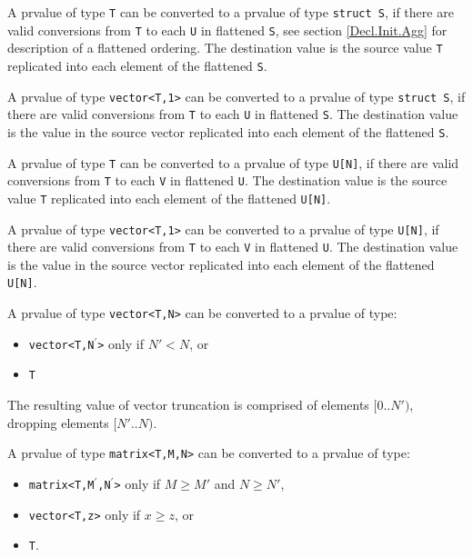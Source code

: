 
\p A prvalue of type \texttt{T} can be converted to a prvalue of type
\texttt{struct S}, if there are valid conversions from \texttt{T} to each
\texttt{U} in flattened \texttt{S}, see section \ref{Decl.Init.Agg} for
description of a flattened ordering. The destination value is the source value
\texttt{T} replicated into each element of the flattened \texttt{S}.

\p A prvalue of type \texttt{vector<T,1>} can be converted to a prvalue of type
\texttt{struct S}, if there are valid conversions from \texttt{T} to each
\texttt{U} in flattened \texttt{S}. The destination value is the value in the
source vector replicated into each element of the flattened \texttt{S}.

\p A prvalue of type \texttt{T} can be converted to a prvalue of type
\texttt{U[N]}, if there are valid conversions from \texttt{T} to each \texttt{V}
in flattened \texttt{U}. The destination value is the source value \texttt{T}
replicated into each element of the flattened \texttt{U[N]}.

\p A prvalue of type \texttt{vector<T,1>} can be converted to a prvalue of type
\texttt{U[N]}, if there are valid conversions from \texttt{T} to each \texttt{V}
in flattened \texttt{U}. The destination value is the value in the source vector
replicated into each element of the flattened \texttt{U[N]}.


\p A prvalue of type \texttt{vector<T,N>} can be converted to a prvalue of type:
\begin{itemize}
\item \texttt{vector<T,N$^\prime$>} only if \( N\prime < N \), or
\item \texttt{T}
\end{itemize}

\p The resulting value of vector truncation is comprised of elements \( [0..N\prime)
\), dropping elements \( [N\prime..N) \).

\p A prvalue of type \texttt{matrix<T,M,N>} can be converted to a prvalue of
type:
\begin{itemize}
  \item \texttt{matrix<T,M$^\prime$,N$^\prime$>} only if \( M \geq M\prime \) and \(N \geq N\prime \),
  \item \texttt{vector<T,z>} only if \( x \geq z \), or
  \item \texttt{T}.
\end{itemize}

